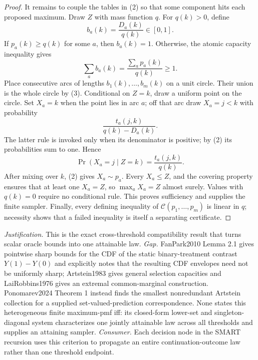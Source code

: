 \documentclass{article}
\begin{document}
\begin{proof}
It remains to couple the tables in (2) so that some component hits each proposed maximum.  Draw \(Z\) with mass function \(q\).  For \(q(k)>0\), define
\[
 b_a(k)=\frac{D_a(k)}{q(k)}\in[0,1].
\]
If \(p_a(k)\geq q(k)\) for some \(a\), then \(b_a(k)=1\).  Otherwise, the atomic capacity inequality gives
\[
 \sum_ab_a(k)=\frac{\sum_ap_a(k)}{q(k)}\geq1.              \tag{3}
\]
Place consecutive arcs of lengths \(b_1(k),\ldots,b_m(k)\) on a unit circle.  Their union is the whole circle by (3).  Conditional on \(Z=k\), draw a uniform point on the circle.  Set \(X_a=k\) when the point lies in arc \(a\); off that arc draw \(X_a=j<k\) with probability
\[
 \frac{t_a(j,k)}{q(k)-D_a(k)}.
\]
The latter rule is invoked only when its denominator is positive; by (2) its probabilities sum to one.  Hence
\[
 \Pr(X_a=j\mid Z=k)=\frac{t_a(j,k)}{q(k)}.
\]
After mixing over \(k\), (2) gives \(X_a\sim p_a\).  Every \(X_a\leq Z\), and the covering property ensures that at least one \(X_a=Z\), so \(\max_aX_a=Z\) almost surely.  Values with \(q(k)=0\) require no conditional rule.  This proves sufficiency and supplies the finite sampler.  Finally, every defining inequality of \(\mathcal C(p_1,\ldots,p_m)\) is linear in \(q\); necessity shows that a failed inequality is itself a separating certificate.
\end{proof}
\par\smallskip\noindent \textit{Justification.} This is the exact cross-threshold compatibility result that turns scalar oracle bounds into one attainable law. \textit{Gap.} FanPark2010 Lemma 2.1 gives pointwise sharp bounds for the CDF of the static binary-treatment contrast \(Y(1)-Y(0)\) and explicitly notes that the resulting CDF envelopes need not be uniformly sharp; Artstein1983 gives general selection capacities and LaiRobbins1976 gives an extremal common-marginal construction. Ponomarev2024 Theorem 1 instead finds the smallest nonredundant Artstein collection for a supplied set-valued-prediction correspondence. None states this heterogeneous finite maximum-pmf iff: its closed-form lower-set and singleton-diagonal system characterizes one jointly attainable law across all thresholds and supplies an attaining sampler. \textit{Consumer.} Each decision node in the SMART recursion uses this criterion to propagate an entire continuation-outcome law rather than one threshold endpoint.
\end{document}
